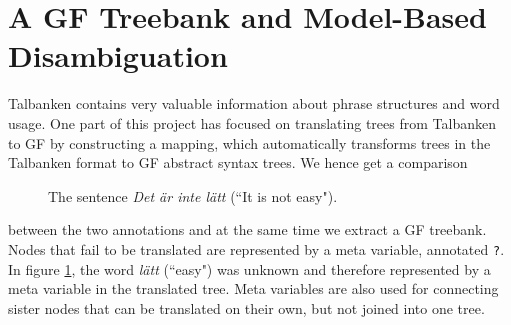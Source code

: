 \documentclass[runningheads,a4paper]{llncs}
\begin{document}


\section{A GF Treebank and Model-Based Disambiguation}
\label{sec:mapping}


Talbanken contains very valuable information about phrase structures and word 
usage.
One part of this project has focused on translating trees from Talbanken to GF
by constructing a mapping, which automatically transforms trees in the
Talbanken format to GF abstract syntax trees. We hence get a comparison 
\begin{figure}[!h]
\centering
{}
\caption{The sentence \emph{Det är inte lätt} (``It is not easy").}
\label{fig:gftree1}
\end{figure}
between the two annotations and at the same time we extract a GF treebank.
Nodes that fail to be translated are represented by a meta variable,
annotated \verb-?-.  In figure \ref{fig:gftree1}, the word \emph{lätt} (``easy")
was unknown and therefore represented by a meta variable in the 
translated tree. Meta variables are also used for connecting 
sister nodes that can be translated on their own, but not joined into one tree.
\end{document}
